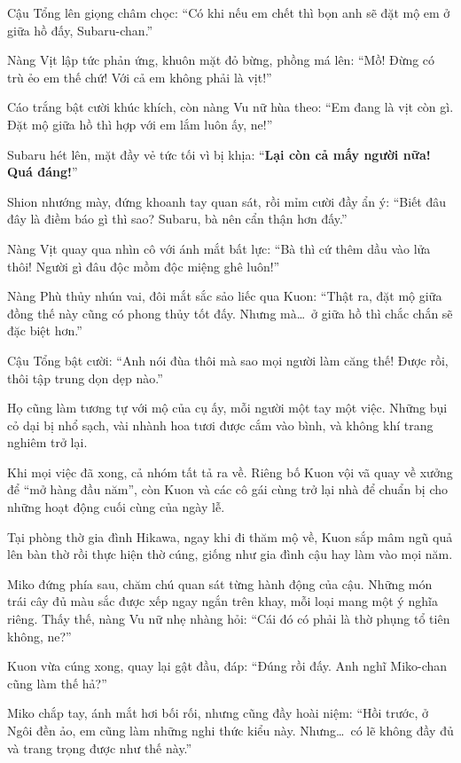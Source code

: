 \documentclass[../main.tex]{subfiles}
\begin{document}
Cậu Tổng lên giọng châm chọc: ``Có khi nếu em chết thì bọn anh sẽ đặt mộ em ở giữa hồ đấy, Subaru-chan.''

Nàng Vịt lập tức phản ứng, khuôn mặt đỏ bừng, phồng má lên: ``Mồ! Đừng có trù ẻo em thế chứ! Với cả em không phải là vịt!''

Cáo trắng bật cười khúc khích, còn nàng Vu nữ hùa theo: ``Em đang là vịt còn gì. Đặt mộ giữa hồ thì hợp với em lắm luôn ấy, ne!''

Subaru hét lên, mặt đầy vẻ tức tối vì bị khịa: ``\textbf{Lại còn cả mấy người nữa! Quá đáng!}''

Shion nhướng mày, đứng khoanh tay quan sát, rồi mỉm cười đầy ẩn ý: ``Biết đâu đây là điềm báo gì thì sao? Subaru, bà nên cẩn thận hơn đấy.''

Nàng Vịt quay qua nhìn cô với ánh mắt bất lực: ``Bà thì cứ thêm dầu vào lửa thôi! Người gì đâu độc mồm độc miệng ghê luôn!''

Nàng Phù thủy nhún vai, đôi mắt sắc sảo liếc qua Kuon: ``Thật ra, đặt mộ giữa đồng thế này cũng có phong thủy tốt đấy. Nhưng mà\dots\ ở giữa hồ thì chắc chắn sẽ đặc biệt hơn.''

Cậu Tổng bật cười: ``Anh nói đùa thôi mà sao mọi người làm căng thế! Được rồi, thôi tập trung dọn dẹp nào.''

Họ cũng làm tương tự với mộ của cụ ấy, mỗi người một tay một việc. Những bụi cỏ dại bị nhổ sạch, vài nhành hoa tươi được cắm vào bình, và không khí trang nghiêm trở lại.

Khi mọi việc đã xong, cả nhóm tất tả ra về. Riêng bố Kuon vội vã quay về xưởng để ``mở hàng đầu năm'', còn Kuon và các cô gái cùng trở lại nhà để chuẩn bị cho những hoạt động cuối cùng của ngày lễ.

\ct

Tại phòng thờ gia đình Hikawa, ngay khi đi thăm mộ về, Kuon sắp mâm ngũ quả lên bàn thờ rồi thực hiện thờ cúng, giống như gia đình cậu hay làm vào mọi năm.

Miko đứng phía sau, chăm chú quan sát từng hành động của cậu. Những món trái cây đủ màu sắc được xếp ngay ngắn trên khay, mỗi loại mang một ý nghĩa riêng. Thấy thế, nàng Vu nữ nhẹ nhàng hỏi: ``Cái đó có phải là thờ phụng tổ tiên không, ne?''

Kuon vừa cúng xong, quay lại gật đầu, đáp: ``Đúng rồi đấy. Anh nghĩ Miko-chan cũng làm thế hả?''

Miko chắp tay, ánh mắt hơi bối rối, nhưng cũng đầy hoài niệm: ``Hồi trước, ở Ngôi đền ảo, em cũng làm những nghi thức kiểu này. Nhưng\dots\ có lẽ không đầy đủ và trang trọng được như thế này.''
\end{document}
